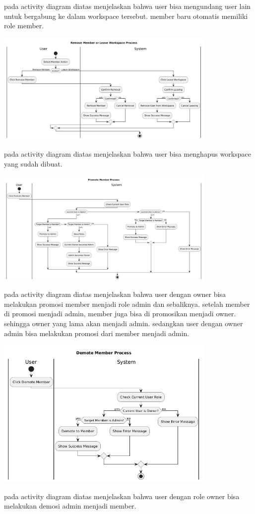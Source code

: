 pada activity diagram diatas menjelaskan bahwa user bisa mengundang user lain untuk bergabung ke dalam workspace tersebut.
member baru otomatis memiliki role member.
\begin{center}
    \includegraphics[width=0.8\textwidth]{assets/activity_diagrams/workspace_remove.png}
\end{center}
pada activity diagram diatas menjelaskan bahwa user bisa menghapus workspace yang sudah dibuat.
\begin{center}
    \includegraphics[width=0.8\textwidth]{assets/activity_diagrams/member_promote.png}
\end{center}
pada activity diagram diatas menjelaskan bahwa user dengan owner bisa melakukan promosi member menjadi role admin dan sebaliknya.
setelah member di promosi menjadi admin, member juga bisa di promosikan menjadi owner. sehingga owner yang lama akan menjadi admin.
sedangkan user dengan owner admin bisa melakukan promosi dari member menjadi admin.
\begin{center}
    \includegraphics[width=0.8\textwidth]{assets/activity_diagrams/member_demote.png}
\end{center}
pada activity diagram diatas menjelaskan bahwa user dengan role owner bisa melakukan demosi admin menjadi member.

